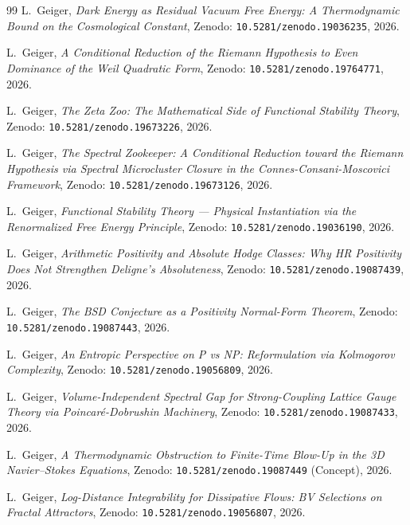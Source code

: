 \documentclass[11pt,a4paper]{article}
\theoremstyle{remark}
\begin{document}
\begin{thebibliography}{99}
L.~Geiger,
\emph{Dark Energy as Residual Vacuum Free Energy: A Thermodynamic
Bound on the Cosmological Constant},
Zenodo: \texttt{10.5281/zenodo.19036235}, 2026.

L.~Geiger,
\emph{A Conditional Reduction of the Riemann Hypothesis to Even Dominance
of the Weil Quadratic Form},
Zenodo: \texttt{10.5281/zenodo.19764771}, 2026.

L.~Geiger,
\emph{The Zeta Zoo: The Mathematical Side of Functional Stability Theory},
Zenodo: \texttt{10.5281/zenodo.19673226}, 2026.

L.~Geiger,
\emph{The Spectral Zookeeper: A Conditional Reduction toward the Riemann
Hypothesis via Spectral Microcluster Closure in the
Connes-Consani-Moscovici Framework},
Zenodo: \texttt{10.5281/zenodo.19673126}, 2026.

L.~Geiger,
\emph{Functional Stability Theory --- Physical Instantiation via the
Renormalized Free Energy Principle},
Zenodo: \texttt{10.5281/zenodo.19036190}, 2026.

L.~Geiger,
\emph{Arithmetic Positivity and Absolute Hodge Classes: Why HR
Positivity Does Not Strengthen Deligne's Absoluteness},
Zenodo: \texttt{10.5281/zenodo.19087439}, 2026.

L.~Geiger,
\emph{The BSD Conjecture as a Positivity Normal-Form Theorem},
Zenodo: \texttt{10.5281/zenodo.19087443}, 2026.

L.~Geiger,
\emph{An Entropic Perspective on P vs NP: Reformulation via Kolmogorov
Complexity},
Zenodo: \texttt{10.5281/zenodo.19056809}, 2026.

L.~Geiger,
\emph{Volume-Independent Spectral Gap for Strong-Coupling Lattice
Gauge Theory via Poincar\'e-Dobrushin Machinery},
Zenodo: \texttt{10.5281/zenodo.19087433}, 2026.

L.~Geiger,
\emph{A Thermodynamic Obstruction to Finite-Time Blow-Up in the
3D Navier--Stokes Equations},
Zenodo: \texttt{10.5281/zenodo.19087449} (Concept), 2026.

L.~Geiger,
\emph{Log-Distance Integrability for Dissipative Flows: BV Selections
on Fractal Attractors},
Zenodo: \texttt{10.5281/zenodo.19056807}, 2026.


\end{thebibliography}
\end{document}
